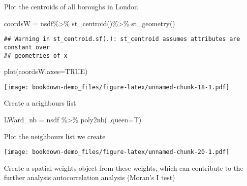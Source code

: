 \documentclass[
]{book}
\newenvironment{Shaded}{\begin{snugshade}}{\end{snugshade}}
\newcommand{\AttributeTok}[1]{\textcolor[rgb]{0.77,0.63,0.00}{#1}}
\newcommand{\ConstantTok}[1]{\textcolor[rgb]{0.00,0.00,0.00}{#1}}
\newcommand{\FunctionTok}[1]{\textcolor[rgb]{0.00,0.00,0.00}{#1}}
\newcommand{\NormalTok}[1]{#1}
\newcommand{\OtherTok}[1]{\textcolor[rgb]{0.56,0.35,0.01}{#1}}
\newcommand{\SpecialCharTok}[1]{\textcolor[rgb]{0.00,0.00,0.00}{#1}}
\newcommand{\StringTok}[1]{\textcolor[rgb]{0.31,0.60,0.02}{#1}}
\begin{document}
Plot the centroids of all boroughs in London

\begin{Shaded}
\begin{Highlighting}[]
\NormalTok{coordsW }\OtherTok{=}\NormalTok{ nsdf}\SpecialCharTok{\%\textgreater{}\%}
   \FunctionTok{st\_centroid}\NormalTok{()}\SpecialCharTok{\%\textgreater{}\%}
   \FunctionTok{st\_geometry}\NormalTok{()}
\end{Highlighting}
\end{Shaded}

\begin{verbatim}
## Warning in st_centroid.sf(.): st_centroid assumes attributes are constant over
## geometries of x
\end{verbatim}

\begin{Shaded}
\begin{Highlighting}[]
 \FunctionTok{plot}\NormalTok{(coordsW,}\AttributeTok{axes=}\ConstantTok{TRUE}\NormalTok{)}
\end{Highlighting}
\end{Shaded}

\texttt{[image: bookdown-demo\_files/figure-latex/unnamed-chunk-18-1.pdf]}

Create a neighbours list

\begin{Shaded}
\begin{Highlighting}[]
\NormalTok{ LWard\_nb }\OtherTok{=}\NormalTok{ nsdf }\SpecialCharTok{\%\textgreater{}\%} 
  \FunctionTok{poly2nb}\NormalTok{(.,}\AttributeTok{queen=}\NormalTok{T)}
\end{Highlighting}
\end{Shaded}

Plot the neighbours list we create

\begin{Shaded}
\end{Shaded}

\texttt{[image: bookdown-demo\_files/figure-latex/unnamed-chunk-20-1.pdf]}

Create a spatial weights object from these weights, which can contribute to the further analysis autocorrelation analysis (Moran's I test)
\end{document}
